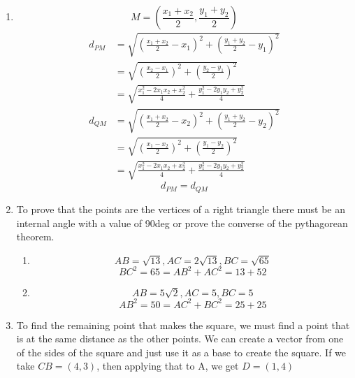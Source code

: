 \begin{enumerate}
    \item [36.]
          \[M = (\frac{x_1 + x_2}{2}, \frac{y_1 + y_2}{2})\]
          \begin{align*}
              d_{PM} & = \sqrt{(\frac{x_1 + x_2}{2} - x_1)^2 + (\frac{y_1 + y_2}{2} - y_1)^2} \\
                     & = \sqrt{(\frac{x_2-x_1}{2})^2 + (\frac{y_2-y_1}{2})^2}                 \\
                     & = \sqrt{\frac{x_1^2-2x_1x_2+x_2^2}{4} + \frac{y_1^2-2y_1y_2+y_2^2}{4}} \\
              d_{QM} & = \sqrt{(\frac{x_1 + x_2}{2} - x_2)^2 + (\frac{y_1 + y_2}{2} - y_2)^2} \\
                     & = \sqrt{(\frac{x_1-x_2}{2})^2 + (\frac{y_1-y_2}{2})^2}                 \\
                     & = \sqrt{\frac{x_1^2-2x_1x_2+x_2^2}{4} + \frac{y_1^2-2y_1y_2+y_2^2}{4}}
          \end{align*}
          \[d_{PM} = d_{QM}\]

    \item [37.] To prove that the points are the vertices of a right triangle there must be an internal angle with a value of 90deg or prove the converse of the pythagorean theorem.
          \begin{enumerate}
              \item
                    \[AB = \sqrt{13}, AC=2\sqrt{13}, BC=\sqrt{65}\]
                    \[BC^2 = 65 = AB^2 + AC^2 = 13 + 52\]
              \item
                    \[AB = 5\sqrt{2}, AC=5, BC=5\]
                    \[AB^2 = 50 = AC^2 + BC^2 = 25 + 25\]
          \end{enumerate}

    \item [38.] To find the remaining point that makes the square, we must find a point that is at the same distance as the other points. We can create a vector from one of the sides of the square and just use it as a base to create the square.
          If we take $CB=(4,3)$, then applying that to A, we get $D=(1, 4)$

\end{enumerate}